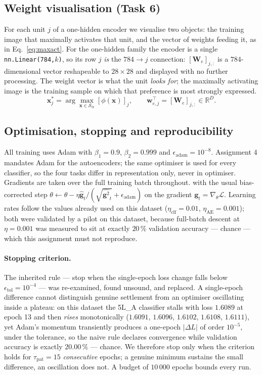 \documentclass[11pt,a4paper]{article}
\newcommand{\R}{\mathbb{R}}\newcommand{\given}{\mid}\newcommand{\Acc}{\mathrm{Acc}}
\newcommand{\code}[1]{\texttt{#1}}
\begin{document}
\subsection{Weight visualisation (Task 6)}\label{sec:arch:wv}
For each unit $j$ of a one-hidden encoder we visualise two objects: the training image that
maximally activates that unit, and the vector of weights feeding it, as in Eq.~\eqref{eq:maxact}.
For the one-hidden family the encoder is a single \code{nn.Linear(784,$k$)}, so its row $j$
\emph{is} the $784\rightarrow j$ connection: $[\mathbf{W}_e]_{j,:}$ is a $784$-dimensional vector
reshapeable to $28\times28$ and displayed with no further processing.  The weight vector is what
the unit \emph{looks for}; the maximally activating image is the training sample on which that
preference is most strongly expressed.
\begin{equation}\label{eq:maxact}
\mathbf{x}^{*}_{j}=\arg\max_{\mathbf{x}\in\mathcal{S}_{\mathrm{tr}}}[\phi(\mathbf{x})]_{j},
\qquad \mathbf{w}_{e,j}^{\top}=[\mathbf{W}_e]_{j,:}\in\R^{D}.
\end{equation}

\subsection{Optimisation, stopping and reproducibility}\label{sec:arch:opt}
All training uses Adam with $\beta_1=0.9$, $\beta_2=0.999$ and $\epsilon_{\mathrm{adam}}=10^{-8}$.
Assignment 4 mandates Adam for the autoencoders; the same optimiser is used for every classifier,
so the four tasks differ in representation only, never in optimiser.  Gradients are taken over the
full training batch throughout.
with the usual bias-corrected step $\theta\leftarrow\theta-\eta\hat{\mathbf{g}}_t/
(\sqrt{\widehat{\mathbf{g}^2}_t}+\epsilon_{\mathrm{adam}})$ on the gradient
$\mathbf{g}_t=\nabla_\theta\mathcal{L}$.  Learning rates follow the values already used on this
dataset ($\eta_{\mathrm{clf}}=0.01$, $\eta_{\mathrm{AE}}=0.001$); both were validated by a pilot on
this dataset, because full-batch descent at $\eta=0.001$ was measured to sit at exactly $20\,\%$
validation accuracy --- chance --- which this assignment must not reproduce.

\paragraph{Stopping criterion.}
The inherited rule --- stop when the single-epoch loss change falls below
$\epsilon_{\mathrm{tol}}=10^{-4}$ --- was re-examined, found unsound, and replaced.  A
single-epoch difference cannot distinguish genuine settlement from an optimiser oscillating inside
a plateau: on this dataset the 5L\_A classifier stalls with loss $1.6089$ at epoch 13 and then
\emph{rises} monotonically ($1.6091$, $1.6096$, $1.6102$, $1.6108$, $1.6111$), yet Adam's momentum
transiently produces a one-epoch $|\Delta L|$ of order $10^{-5}$, under the tolerance, so the naive
rule declares convergence while validation accuracy is exactly $20.00\,\%$ --- chance.  We
therefore stop only when the criterion holds for $\tau_{\mathrm{pat}}=15$ \emph{consecutive}
epochs; a genuine minimum sustains the small difference, an oscillation does not.  A budget of
$10\,000$ epochs bounds every run.
\end{document}
